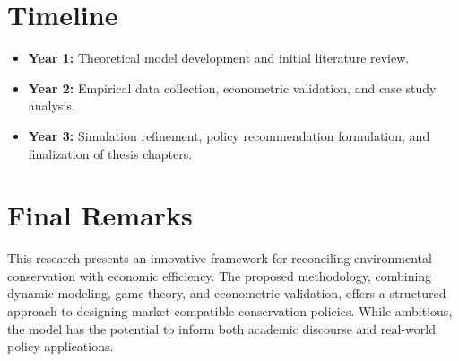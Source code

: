 \documentclass[a4paper,12pt]{article}
\begin{document}
\newpage

\section{Timeline}

\begin{itemize}
    \item \textbf{Year 1:} Theoretical model development and initial literature review.
    \item \textbf{Year 2:} Empirical data collection, econometric validation, and case study analysis.
    \item \textbf{Year 3:} Simulation refinement, policy recommendation formulation, and finalization of thesis chapters.
\end{itemize}

\newpage

\section{Final Remarks}
This research presents an innovative framework for reconciling environmental conservation with economic efficiency. The proposed methodology, combining dynamic modeling, game theory, and econometric validation, offers a structured approach to designing market-compatible conservation policies. While ambitious, the model has the potential to inform both academic discourse and real-world policy applications.

\newpage



\end{document}
